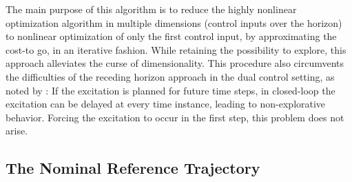 The main purpose of this algorithm is to reduce the highly nonlinear
optimization algorithm in multiple dimensions (control inputs over the horizon)
to nonlinear optimization of only the first control input, by approximating the
cost-to go, in an iterative fashion. While retaining the possibility to
explore, this approach alleviates the curse of dimensionality. This procedure
also circumvents the difficulties of the receding horizon approach in the dual
control setting, as noted by \textcite{Marafioti.Bitmead.ea:2014:Persistently}:
If the excitation is planned for future time steps, in closed-loop the
excitation can be delayed at every time instance, leading to non-explorative
behavior. Forcing the excitation to occur in the first step, this problem
does not arise.

\subsection{The Nominal Reference Trajectory}
\label{sec:cert-equiv-contr}

